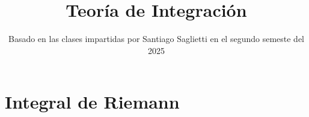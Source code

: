 \documentclass[a4paper]{report}
\title{Teoría de Integración}
\author{}
\date{Basado en las clases impartidas por Santiago Saglietti en el segundo semeste del 2025}
\begin{document}
    \maketitle
    \tableofcontents

    \chapter{Integral de Riemann}
    \setcounter{section}{0}

	
	
	
	
	
	
	
	
	
	
	
	
	
	
	
	
	
	
	
	
	


\end{document}
